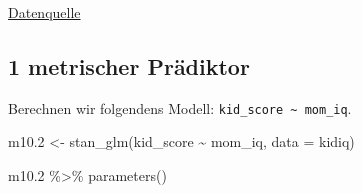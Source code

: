 \documentclass[
  a4paper,
  DIV=11]{scrreprt}
\newenvironment{Shaded}{\begin{snugshade}}{\end{snugshade}}
\newcommand{\AttributeTok}[1]{\textcolor[rgb]{0.40,0.45,0.13}{#1}}
\newcommand{\FloatTok}[1]{\textcolor[rgb]{0.68,0.00,0.00}{#1}}
\newcommand{\FunctionTok}[1]{\textcolor[rgb]{0.28,0.35,0.67}{#1}}
\newcommand{\NormalTok}[1]{\textcolor[rgb]{0.00,0.23,0.31}{#1}}
\newcommand{\OtherTok}[1]{\textcolor[rgb]{0.00,0.23,0.31}{#1}}
\newcommand{\SpecialCharTok}[1]{\textcolor[rgb]{0.37,0.37,0.37}{#1}}
\theoremstyle{definition}
\theoremstyle{remark}
\begin{document}
\href{https://raw.githubusercontent.com/sebastiansauer/2021-wise/main/Data/kidiq.csv}{Datenquelle}

\hypertarget{metrischer-pruxe4diktor}{%
\subsection{1 metrischer Prädiktor}\label{metrischer-pruxe4diktor}}

Berechnen wir folgendens Modell:
\texttt{kid\_score\ \textasciitilde{}\ mom\_iq}.

\begin{Shaded}
\begin{Highlighting}[]
\NormalTok{m10}\FloatTok{.2} \OtherTok{\textless{}{-}}
  \FunctionTok{stan\_glm}\NormalTok{(kid\_score }\SpecialCharTok{\textasciitilde{}}\NormalTok{ mom\_iq, }\AttributeTok{data =}\NormalTok{ kidiq)}

\NormalTok{m10}\FloatTok{.2} \SpecialCharTok{\%\textgreater{}\%} 
  \FunctionTok{parameters}\NormalTok{()}
\end{Highlighting}
\end{Shaded}
\end{document}
